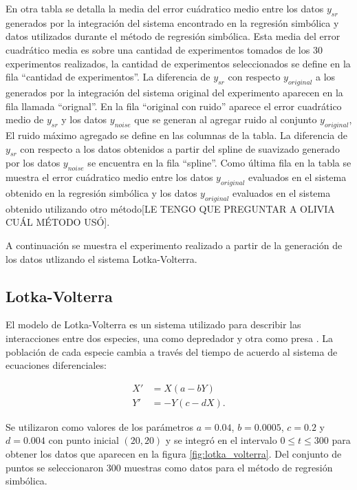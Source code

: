 En otra tabla se detalla la media del error cuádratico medio entre los datos $y_{sr}$ generados por la integración del sistema encontrado en la regresión simbólica y datos utilizados durante el método de regresión simbólica. Esta media del error cuadrático media es sobre una cantidad de experimentos tomados de los 30 experimentos realizados, la cantidad de experimentos seleccionados se define en la fila ``cantidad de experimentos''. La diferencia de $y_{sr}$ con respecto $y_{original}$ a los generados por la integración del sistema original del experimento aparecen en la fila llamada ``orignal''. En la fila ``original con ruido'' aparece el error cuadrático medio de $y_{sr}$ y los datos $y_{noise}$ que se generan al agregar ruido al conjunto $y_{original}$, El ruido máximo agregado se define en las columnas de la tabla. La diferencia de $y_{sr}$ con respecto a los datos obtenidos a partir del spline de suavizado generado por los datos $y_{noise}$ se encuentra en la fila ``spline''. Como última fila en la tabla se muestra el error cuádratico medio entre los datos $y_{original}$ evaluados en el sistema obtenido en la regresión simbólica y los datos $y_{original}$ evaluados en el sistema obtenido utilizando otro método[LE TENGO QUE PREGUNTAR A OLIVIA CUÁL MÉTODO USÓ].

A continuación se muestra el experimento realizado a partir de la generación de los datos utlizando el sistema Lotka-Volterra.

\subsection{Lotka-Volterra}

El modelo de Lotka-Volterra es un sistema utilizado para describir las interacciones entre dos especies, una como depredador y otra como presa \cite{Hoppensteadt:2006}. La población de cada especie cambia a través del tiempo de acuerdo al sistema de ecuaciones diferenciales:

\begin{align*}
    X' & = X (a - b Y)   \\
    Y' & = -Y (c - d X).
\end{align*}

Se utilizaron como valores de los parámetros $a = 0.04$, $b = 0.0005$, $c = 0.2$ y $d = 0.004$ con punto inicial $(20, 20)$ y se integró en el intervalo $0 \leq t \leq 300$ para obtener los datos que aparecen en la figura \ref{fig:lotka_volterra}. Del conjunto de puntos se seleccionaron 300 muestras como datos para el método de regresión simbólica.

